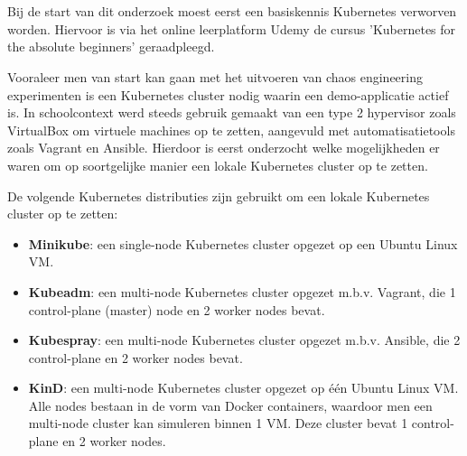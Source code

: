 
\chapter{}
\label{ch:methodologie}


Bij de start van dit onderzoek moest eerst een basiskennis Kubernetes verworven worden. Hiervoor is via het online leerplatform Udemy de cursus 'Kubernetes for the absolute beginners' geraadpleegd. \autocite{Mannambeth2021}  

Vooraleer men van start kan gaan met het uitvoeren van chaos engineering experimenten is een Kubernetes cluster nodig waarin een demo-applicatie actief is. In schoolcontext werd steeds gebruik gemaakt van een type 2 hypervisor zoals VirtualBox om virtuele machines op te zetten, aangevuld met automatisatietools zoals Vagrant en Ansible. Hierdoor is eerst onderzocht welke mogelijkheden er waren om op soortgelijke manier een lokale Kubernetes cluster op te zetten. 

De volgende Kubernetes distributies zijn gebruikt om een lokale Kubernetes cluster op te zetten:
 
\begin{itemize}
    \item {\bf Minikube}: een single-node Kubernetes cluster opgezet op een Ubuntu Linux VM. 
    \item {\bf Kubeadm}: een multi-node Kubernetes cluster opgezet m.b.v. Vagrant, die 1 control-plane (master) node en 2 worker nodes bevat.
    \item {\bf Kubespray}: een multi-node Kubernetes cluster opgezet m.b.v. Ansible, die 2 control-plane en 2 worker nodes bevat.  
    \item {\bf KinD}: een multi-node Kubernetes cluster opgezet op één Ubuntu Linux VM. Alle nodes bestaan in de vorm van Docker containers, waardoor men een multi-node cluster kan simuleren binnen 1 VM. Deze cluster bevat 1 control-plane en 2 worker nodes.
\end{itemize}

